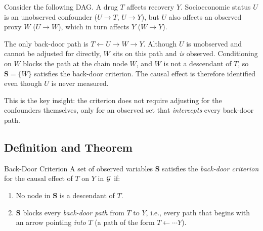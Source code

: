 \documentclass[master.tex]{subfiles}
\begin{document}
Consider the following DAG.  A drug $T$ affects recovery $Y$.
Socioeconomic status $U$ is an unobserved confounder ($U \to T$, $U \to Y$),
but $U$ also affects an observed proxy $W$ ($U \to W$), which in turn affects $Y$
($W \to Y$).

\begin{center}
\end{center}

\noindent
The only back-door path is $T \leftarrow U \to W \to Y$.  Although $U$ is unobserved
and cannot be adjusted for directly, $W$ sits on this path and \emph{is} observed.
Conditioning on $W$ blocks the path at the chain node $W$, and $W$ is not a descendant
of $T$, so $\mathbf{S} = \{W\}$ satisfies the back-door criterion.  The causal effect is
therefore identified even though $U$ is never measured.

This is the key insight: the criterion does not require adjusting for the confounders
themselves, only for an observed set that \emph{intercepts} every back-door path.

\subsection{Definition and Theorem}
\label{w3:sec:backdoor-def}
\begin{defn}{Back-Door Criterion}
\label{w3:def:backdoor}
A set of observed variables $\mathbf{S}$ satisfies the \emph{back-door
criterion} for the causal effect of $T$ on $Y$ in $\mathcal{G}$ if:
\begin{enumerate}
  \item No node in $\mathbf{S}$ is a descendant of $T$.
  \item $\mathbf{S}$ blocks every \emph{back-door path} from $T$ to $Y$,
        i.e., every path that begins with an arrow pointing \emph{into}
        $T$ (a path of the form $T \leftarrow \cdots Y$).
\end{enumerate}
\end{defn}
\end{document}
